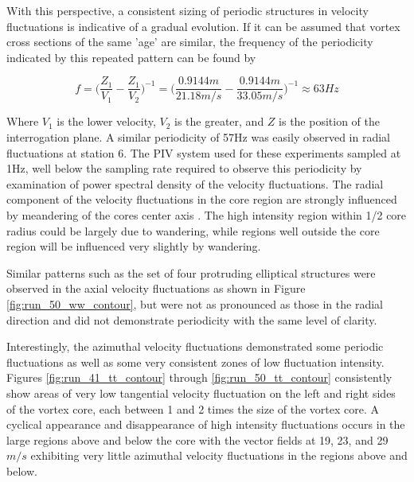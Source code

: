 










With this perspective, a consistent sizing of periodic structures in velocity 
fluctuations is indicative of a gradual evolution. If it can be assumed that 
vortex cross sections of the same 'age' are similar, the frequency of the 
periodicity indicated by this repeated pattern can be found by

\begin{equation}
f = \Big(\frac{Z_1}{V_1} - \frac{Z_1}{V_2}\Big)^{-1} = 
\Big(\frac{0.9144m}{21.18 m/s}-\frac{0.9144m}{33.05 m/s}\Big)^{-1} \approx 63 Hz
\label{eq:period_frequency}
\end{equation}

\noindent
Where $V_1$ is the lower velocity, $V_2$ is the greater, and $Z$ is the 
position of the interrogation plane. A similar periodicity of 57Hz was easily
observed in radial fluctuations at station 6. The PIV system used for these 
experiments sampled at 1Hz, well below the sampling rate required to observe 
this periodicity by examination of power spectral density of the velocity 
fluctuations. The radial component of the velocity fluctuations in the core 
region are strongly influenced by meandering of the cores center axis 
\cite{bandyopadhyay1991}. The 
high intensity region within 1/2 core radius could be largely due to wandering, 
while regions well outside the core region will be influenced very slightly by 
wandering.

Similar patterns such as the set of four protruding elliptical structures were 
observed in the axial velocity fluctuations as shown in 
Figure \ref{fig:run_50_ww_contour}, but were not as pronounced as those in the 
radial direction and did not demonstrate periodicity with the same level of 
clarity.



Interestingly, the azimuthal velocity fluctuations demonstrated some
periodic fluctuations as well as some very consistent zones of low fluctuation 
intensity.
Figures \ref{fig:run_41_tt_contour} through \ref{fig:run_50_tt_contour} 
consistently show areas of very low tangential velocity fluctuation on the left 
and right sides of the vortex core, each between 1 and 2 times the size of the 
vortex core. A cyclical appearance and disappearance of high intensity 
fluctuations occurs in the large regions above and below the core with the 
vector fields at 19, 23, and 29 $m/s$ exhibiting very little azimuthal velocity 
fluctuations in the regions above and below.

